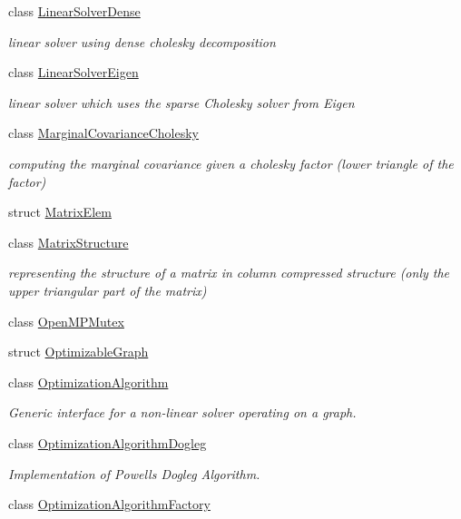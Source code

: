 \begin{DoxyCompactItemize}
class \hyperlink{classg2o_1_1LinearSolverDense}{Linear\+Solver\+Dense}
\begin{DoxyCompactList}\small\item\em linear solver using dense cholesky decomposition \end{DoxyCompactList}\item 
class \hyperlink{classg2o_1_1LinearSolverEigen}{Linear\+Solver\+Eigen}
\begin{DoxyCompactList}\small\item\em linear solver which uses the sparse Cholesky solver from Eigen \end{DoxyCompactList}\item 
class \hyperlink{classg2o_1_1MarginalCovarianceCholesky}{Marginal\+Covariance\+Cholesky}
\begin{DoxyCompactList}\small\item\em computing the marginal covariance given a cholesky factor (lower triangle of the factor) \end{DoxyCompactList}\item 
struct \hyperlink{structg2o_1_1MatrixElem}{Matrix\+Elem}
\item 
class \hyperlink{classg2o_1_1MatrixStructure}{Matrix\+Structure}
\begin{DoxyCompactList}\small\item\em representing the structure of a matrix in column compressed structure (only the upper triangular part of the matrix) \end{DoxyCompactList}\item 
class \hyperlink{classg2o_1_1OpenMPMutex}{Open\+M\+P\+Mutex}
\item 
struct \hyperlink{structg2o_1_1OptimizableGraph}{Optimizable\+Graph}
\item 
class \hyperlink{classg2o_1_1OptimizationAlgorithm}{Optimization\+Algorithm}
\begin{DoxyCompactList}\small\item\em Generic interface for a non-\/linear solver operating on a graph. \end{DoxyCompactList}\item 
class \hyperlink{classg2o_1_1OptimizationAlgorithmDogleg}{Optimization\+Algorithm\+Dogleg}
\begin{DoxyCompactList}\small\item\em Implementation of Powell\textquotesingle{}s Dogleg Algorithm. \end{DoxyCompactList}\item 
class \hyperlink{classg2o_1_1OptimizationAlgorithmFactory}{Optimization\+Algorithm\+Factory}

\end{DoxyCompactItemize}
